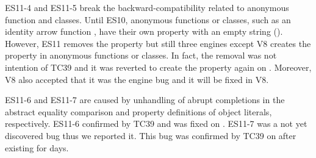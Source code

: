 ES11-4 and ES11-5 break the backward-compatibility related to anonymous function
and classes.  Until ES10, anonymous functions or classes, such as an identity
arrow function , have their own property  with an empty
string ().  However, ES11 removes the  property but still
three engines except V8 creates the  property in anonymous
functions or classes.  In fact, the removal was not intention of TC39 and it was
reverted to create the property again on \inred{-}.  Moreover, V8 also accepted
that it was the engine bug and it will be fixed in V8.

ES11-6 and ES11-7 are caused by unhandling of abrupt completions in the abstract
equality comparison and property definitions of object literals, respectively.
ES11-6 confirmed by TC39 and was fixed on \inred{-}.  ES11-7 was a not yet
discovered bug thus we reported it.  This bug was confirmed by TC39 on \inred{-}
after existing for \inred{-} days.
